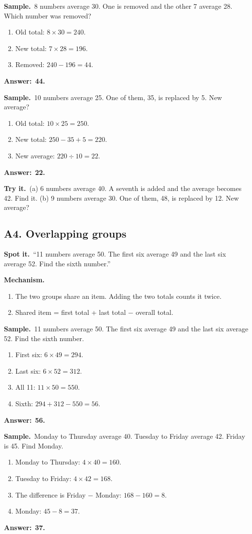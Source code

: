 \documentclass[11pt,a4paper]{article}
\let\oldsubsection\subsection
\renewcommand{\subsection}{\needspace{9\baselineskip}\oldsubsection}
\newcommand{\spot}{\textbf{\color{ember}Spot it.}\ }
\newcommand{\mech}{\textbf{\color{ember}Mechanism.}\ }
\newif\ifkeepsamp
\newcommand{\ans}[1]{\par\nopagebreak\noindent\textbf{\color{ember}Answer:}\ \textbf{#1}\par}
\newcommand{\samp}{\ifkeepsamp\needspace{4\baselineskip}\fi\textbf{\color{ember}Sample.}\ }
\newcommand{\tryit}[1]{\textbf{\color{ember}Try it.}\ #1}
\begin{document}
\samp 8 numbers average 30. One is removed and the other 7 average 28. Which number was removed?
\begin{enumerate}
\item Old total: $8 \times 30 = 240$.
\item New total: $7 \times 28 = 196$.
\item Removed: $240 - 196 = 44$.
\end{enumerate}
\ans{44.}

\samp 10 numbers average 25. One of them, 35, is replaced by 5. New average?
\begin{enumerate}
\item Old total: $10 \times 25 = 250$.
\item New total: $250 - 35 + 5 = 220$.
\item New average: $220 \div 10 = 22$.
\end{enumerate}
\ans{22.}

\tryit (a) 6 numbers average 40. A seventh is added and the average becomes 42. Find it. (b) 9 numbers average 30. One of them, 48, is replaced by 12. New average?

\subsection{A4. Overlapping groups}
\spot ``11 numbers average 50. The first six average 49 and the last six average 52. Find the sixth number.''

\mech
\begin{enumerate}
\item The two groups share an item. Adding the two totals counts it twice.
\item Shared item = first total + last total $-$ overall total.
\end{enumerate}

\samp 11 numbers average 50. The first six average 49 and the last six average 52. Find the sixth number.
\begin{enumerate}
\item First six: $6 \times 49 = 294$.
\item Last six: $6 \times 52 = 312$.
\item All 11: $11 \times 50 = 550$.
\item Sixth: $294 + 312 - 550 = 56$.
\end{enumerate}
\ans{56.}

\samp Monday to Thursday average 40. Tuesday to Friday average 42. Friday is 45. Find Monday.
\begin{enumerate}
\item Monday to Thursday: $4 \times 40 = 160$.
\item Tuesday to Friday: $4 \times 42 = 168$.
\item The difference is Friday $-$ Monday: $168 - 160 = 8$.
\item Monday: $45 - 8 = 37$.
\end{enumerate}
\ans{37.}
\end{document}

